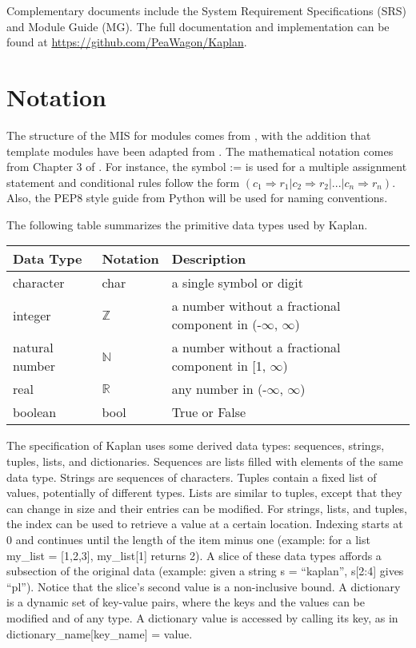 \documentclass[12pt, titlepage]{article}
\newcommand{\progname}{Kaplan}
\begin{document}
Complementary documents include the System Requirement Specifications (SRS)
and Module Guide (MG).  The full documentation and implementation can be
found at \url{https://github.com/PeaWagon/Kaplan}.

\section{Notation}

The structure of the MIS for modules comes from \citet{HoffmanAndStrooper1995},
with the addition that template modules have been adapted from
\cite{GhezziEtAl2003}.  The mathematical notation comes from Chapter 3 of
\citet{HoffmanAndStrooper1995}.  For instance, the symbol := is used for a
multiple assignment statement and conditional rules follow the form $(c_1
\Rightarrow r_1 | c_2 \Rightarrow r_2 | ... | c_n \Rightarrow r_n )$. Also, the 
PEP8 style guide from Python will be used for naming conventions.

The following table summarizes the primitive data types used by \progname. 

\begin{center}
\renewcommand{\arraystretch}{1.2}
\noindent 
\begin{tabular}{l l p{7.5cm}} 
\toprule 
\textbf{Data Type} & \textbf{Notation} & \textbf{Description}\\ 
\midrule
character & char & a single symbol or digit\\
integer & $\mathbb{Z}$ & a number without a fractional component in (-$\infty$, $\infty$) \\
natural number & $\mathbb{N}$ & a number without a fractional component in [1, $\infty$) \\
real & $\mathbb{R}$ & any number in (-$\infty$, $\infty$)\\
boolean & bool & True or False \\


\bottomrule
\end{tabular} 
\end{center}

\noindent
The specification of \progname{} uses some derived data types: sequences, 
strings, tuples, lists, and dictionaries. Sequences are lists filled with 
elements of the same data type. Strings
are sequences of characters. Tuples contain a fixed list of values, potentially 
of different types. Lists are similar to tuples, except that they can change in 
size and their entries can be modified. For strings, lists, and tuples, the 
index can be used to retrieve a value at a certain location. Indexing starts at 
0 and continues until the length of the item minus one (example: for a list 
my\_list = [1,2,3], my\_list[1] returns 2). A slice of these data types affords 
a subsection of the original data (example: given a string s = ``kaplan'', 
s[2:4] gives ``pl''). Notice that the slice's second value is a non-inclusive 
bound. A dictionary is a dynamic set of key-value pairs, where the keys and the 
values can be modified and of any type. A dictionary value is accessed by 
calling its key, as in dictionary\_name[key\_name] = value.
\end{document}
